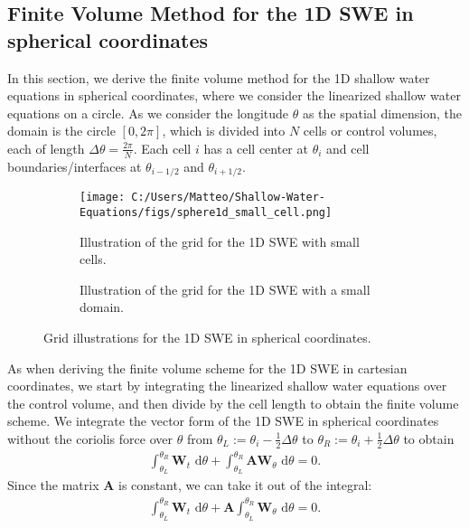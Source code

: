 \subsection{Finite Volume Method for the 1D SWE in spherical coordinates}
In this section, we derive the finite volume method for the 1D shallow water equations in spherical coordinates, where we consider the linearized shallow water equations on a circle.
As we consider the longitude $\theta$ as the spatial dimension, the domain is the circle $[0, 2\pi]$, which is divided into $N$ cells or control volumes, each of length $\Delta \theta = \frac{2\pi}{N}$.
Each cell $i$ has a cell center at $\theta_i$ and cell boundaries/interfaces at $\theta_{i-1/2}$ and $\theta_{i+1/2}$.
\begin{figure}[H]
    \centering
    \begin{subfigure}{0.4\textwidth}
        \centering
        \texttt{[image: C:/Users/Matteo/Shallow-Water-Equations/figs/sphere1d\_small\_cell.png]}
        \caption{Illustration of the grid for the 1D SWE with small cells.}\label{fig:sphere1d_small_cell}
    \end{subfigure}%
    \begin{subfigure}{0.35\textwidth}
        \centering
        \caption{Illustration of the grid for the 1D SWE with a small domain.}\label{fig:sphere1d_small_domain}
    \end{subfigure}
    \caption{Grid illustrations for the 1D SWE in spherical coordinates.}\label{fig:sphere1d_combined}
\end{figure}
As when deriving the finite volume scheme for the 1D SWE in cartesian coordinates, we start by integrating the linearized shallow water equations over the control volume, and then divide by the cell length to obtain the finite volume scheme.
We integrate the vector form of the 1D SWE in spherical coordinates without the coriolis force over $\theta$ from $\theta_L := \theta_i - \frac{1}{2} \Delta \theta $ to $\theta_R := \theta_i + \frac{1}{2}\Delta \theta $ to obtain
\begin{align*}
    \int_{\theta_L}^{\theta_R} \mathbf{W}_t \text{ d}\theta + \int_{\theta_L}^{\theta_R} \mathbf{A} \mathbf{W}_\theta \text{ d}\theta = 0.
\end{align*}
Since the matrix $\mathbf{A}$ is constant, we can take it out of the integral:
\begin{align*}
    \int_{\theta_L}^{\theta_R} \mathbf{W}_t \text{ d}\theta + \mathbf{A} \int_{\theta_L}^{\theta_R} \mathbf{W}_\theta \text{ d}\theta = 0.
\end{align*}
